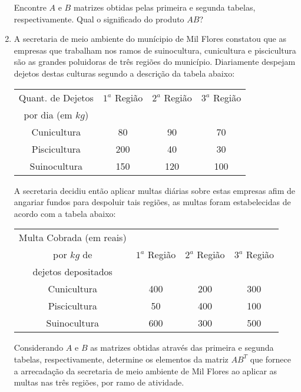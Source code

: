 \documentclass{report}
\begin{document}
\begin{Exercise}
\begin{enumerate}
Encontre $A$ e $B$ matrizes obtidas pelas primeira e segunda
tabelas, respectivamente. Qual o significado do produto $AB$?


\item \label{1lista46} A secretaria de meio ambiente do munícipio
de Mil Flores constatou que as empresas que tra\-ba\-lham nos
ramos de suinocultura, cunicultura e piscicultura são as grandes
poluidoras de três regiões do município. Diariamente despejam
dejetos destas culturas segundo a descrição da tabela abaixo:

\begin{center}
\begin{tabular}
[c]{c||c|c|c}
 \textrm{Quant. de Dejetos} & \textrm{$1^a$ Região} & \textrm{$2^a$ Região} &
 \textrm{$3^a$ Região}\\
 \textrm{por dia (em $kg$)} &   &   &
  \\
 \hline\hline
\textrm{Cunicultura} & 80 & 90 & 70\\
\hline
\textrm{Piscicultura} & 200 & 40 & 30 \\
\hline
\textrm{Suinocultura} & 150 & 120 & 100
\end{tabular}
\end{center}

A secretaria decidiu então aplicar multas diárias sobre estas
empresas afim de angariar fundos para despoluir tais regiões, as
multas foram estabelecidas de acordo com a tabela abaixo:

\begin{center}
\begin{tabular}
[c]{c||c|c|c}
 \textrm{Multa Cobrada (em reais)} &  &   &   \\
 \textrm{por $kg$ de} & \textrm{$1^a$ Região} & \textrm{$2^a$ Região} &
 \textrm{$3^a$ Região}\\
 \textrm{dejetos depositados} &   &   &
  \\
 \hline\hline
\textrm{Cunicultura} & 400 & 200 & 300\\
\hline
\textrm{Piscicultura} & 50 & 400 & 100 \\
\hline
\textrm{Suinocultura} & 600 & 300 & 500
\end{tabular}
\end{center}

Considerando $A$ e $B$ as matrizes obtidas através das primeira e
segunda tabelas, respectivamente, determine os elementos da matriz
$AB^T$ que fornece a arrecadação da secretaria de meio ambiente de
Mil Flores ao aplicar as multas nas três regiões, por ramo de
atividade.

\end{enumerate}

\end{Exercise}
\end{document}
